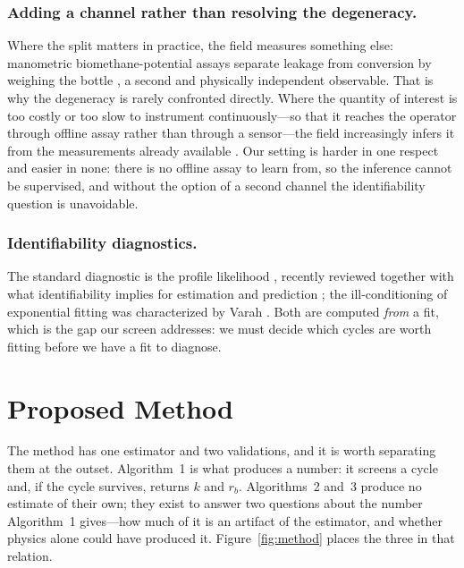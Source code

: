 \documentclass[runningheads]{llncs}
\newcommand{\rb}{\ensuremath{r_{b}}}
\begin{document}
\subsubsection{Adding a channel rather than resolving the degeneracy.}
Where the split matters in practice, the field measures something else:
manometric biomethane-potential assays separate leakage from conversion
by weighing the bottle \cite{hafner2018quantification}, a second and
physically independent observable. That is why the degeneracy is rarely confronted directly. Where the
quantity of interest is too costly or too slow to instrument
continuously---so that it reaches the operator through offline assay
rather than through a sensor---the field increasingly infers it from
the measurements already available \cite{rutland2025application}. Our
setting is harder in one respect and easier in none: there is no
offline assay to learn from, so the inference cannot be supervised, and
without the option of a second channel the identifiability question
is unavoidable.

\subsubsection{Identifiability diagnostics.}
The standard diagnostic is the profile likelihood
\cite{raue2009structural}, recently reviewed together with what
identifiability implies for estimation and prediction
\cite{simpson2026parameter}; the ill-conditioning of exponential
fitting was characterized by Varah \cite{varah1985fitting}. Both are
computed \emph{from} a fit, which is the gap our screen addresses: we
must decide which cycles are worth fitting before we have a fit to
diagnose.

\section{Proposed Method}
\label{sec:method}

The method has one estimator and two validations, and it is worth
separating them at the outset. Algorithm~1 is what produces a number:
it screens a cycle and, if the cycle survives, returns $k$ and \rb{}.
Algorithms~2 and~3 produce no estimate of their own; they exist to
answer two questions about the number Algorithm~1 gives---how much of
it is an artifact of the estimator, and whether physics alone could
have produced it. Figure~\ref{fig:method} places the three in that
relation.
\end{document}
